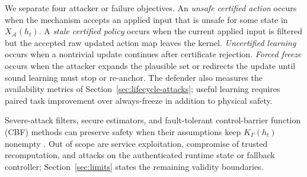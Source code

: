 We separate four attacker or failure objectives.  An \emph{unsafe certified
action} occurs when the mechanism accepts an applied input that is unsafe for
some state in $X_{\mathcal A}(h_t)$.  A \emph{stale certified policy} occurs
when the current applied input is filtered but the accepted raw updated action
map leaves the kernel.  \emph{Uncertified learning} occurs when a nontrivial
update continues after certificate rejection.  \emph{Forced freeze} occurs
when the attacker expands the plausible set or redirects the update until
sound learning must stop or re-anchor.  The defender also measures the
availability metrics of Section~\ref{sec:lifecycle-attacks}; useful learning
requires paired task improvement over always-freeze in addition to physical
safety.

Severe-attack filters, secure estimators, and fault-tolerant control-barrier
function (CBF) methods can preserve safety when their assumptions keep
$K_\Gamma(h_t)$ nonempty
\cite{fawzi_secure_2014,tan_safety_2024,zhang_safe_2022}.  Out of scope are
service exploitation, compromise of trusted recomputation, and attacks on the
authenticated runtime state or fallback controller; Section~\ref{sec:limits}
states the remaining validity boundaries.
